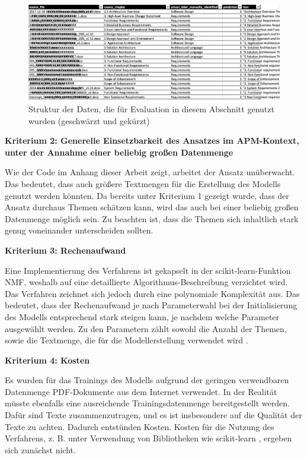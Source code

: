 \begin{figure}[h]
\centering
\includegraphics[scale=0.95]{content/pics/Picture_20.png}
\caption{Struktur der Daten, die für Evaluation in diesem Abschnitt genutzt wurden (geschwärzt und gekürzt)}
\label{Abbildung:test-setup}
\end{figure}

{\bf Kriterium 2: Generelle Einsetzbarkeit des Ansatzes im APM-Kontext, unter der Annahme einer beliebig großen Datenmenge}

Wie der Code im Anhang dieser Arbeit zeigt, arbeitet der Ansatz unüberwacht. Das bedeutet, dass auch größere Textmengen für die Erstellung des Modells genutzt werden könnten. Da bereits unter Kriterium 1 gezeigt wurde, dass der Ansatz durchaus Themen schätzen kann, wird das auch bei einer beliebig großen Datenmenge möglich sein. Zu beachten ist, dass die Themen sich inhaltlich stark genug voneinander unterscheiden sollten.

{\bf Kriterium 3: Rechenaufwand}

Eine Implementierung des Verfahrens ist gekapselt in der scikit-learn-Funktion NMF, weshalb auf eine detaillierte Algorithmus-Beschreibung verzichtet wird. Das Verfahren zeichnet sich jedoch durch eine polynomiale Komplexität aus. Das bedeutet, dass der Rechenaufwand je nach Parameterwahl bei der Initialisierung des Modells entsprechend stark steigen kann, je nachdem welche Parameter ausgewählt werden. Zu den Parametern zählt sowohl die Anzahl der Themen, sowie die Textmenge, die für die Modellerstellung verwendet wird \cite{scikit1}.

{\bf Kriterium 4: Kosten}

Es wurden für das Trainings des Modells aufgrund der geringen verwendbaren Datenmenge PDF-Dokumente aus dem Internet verwendet. In der Realität müsste ebenfalls eine ausreichende Trainingsdatenmenge bereitgestellt werden. Dafür sind Texte zusammenzutragen, und es ist insbesondere auf die Qualität der Texte zu achten. Dadurch entstünden Kosten. Kosten für die Nutzung des Verfahrens, z. B. unter Verwendung von Bibliotheken wie scikit-learn \cite{scikit-license}, ergeben sich zunächst nicht.

